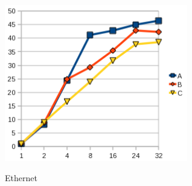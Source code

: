 \documentclass[12pt]{article}
\begin{document}
\begin{figure}[H]
\begin{center}
\includegraphics[width=8cm]{grafy-zprava/zrychlenieth.png}
\label{fig:zrychlenieth}
\caption{Ethernet}
\end{center}
\end{figure}
\end{document}
